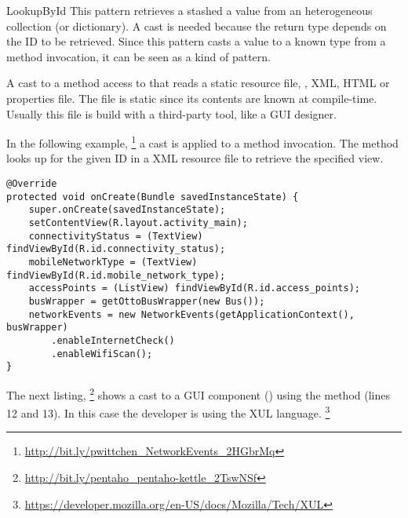 \begin{pattern}{LookupById}
This pattern retrieves a stashed a value from an heterogeneous collection (or dictionary).
A cast is needed because the return type depends on the ID to be retrieved.
Since this pattern casts a value to a known type from a method invocation,
it can be seen as a kind of  pattern.






A cast to a method access to that reads a static resource file, \eg,
XML, HTML or \java{} properties file.
The file is static since its contents are known at compile-time.
Usually this file is build with a third-party tool, like a GUI designer.

In the following example,%
\footnote{\url{http://bit.ly/pwittchen_NetworkEvents_2HGbrMq}}
a cast is applied to a  method invocation.
The  method looks up for the given ID in a XML resource file to retrieve the specified view. 

\begin{verbatim}
@Override
protected void onCreate(Bundle savedInstanceState) {
    super.onCreate(savedInstanceState);
    setContentView(R.layout.activity_main);
    connectivityStatus = (TextView) findViewById(R.id.connectivity_status);
    mobileNetworkType = (TextView) findViewById(R.id.mobile_network_type);
    accessPoints = (ListView) findViewById(R.id.access_points);
    busWrapper = getOttoBusWrapper(new Bus());
    networkEvents = new NetworkEvents(getApplicationContext(), busWrapper)
        .enableInternetCheck()
        .enableWifiScan();
}
\end{verbatim}

The next listing,%
\footnote{\url{http://bit.ly/pentaho_pentaho-kettle_2TswNSf}}
shows a cast to a GUI component () using the  method (lines 12 and 13).
In this case the developer is using the XUL language.%
\footnote{\url{https://developer.mozilla.org/en-US/docs/Mozilla/Tech/XUL}}


\end{pattern}
